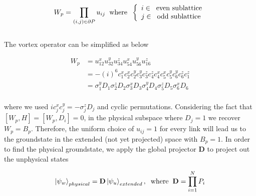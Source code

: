 \documentclass{article}
\begin{document}
\begin{equation}\label{eq:26}
	\begin{aligned}
		W_p = \prod_{(i,j)\in \partial P} u_{ij} \hspace{2mm}\text{where}\hspace{2mm}
		\left\{
		\begin{array}{l}
            i  \in \hspace{2mm} \text{even sublattice} \\
            j  \in \hspace{2mm} \text{odd sublattice}
        \end{array}
        \right.
	\end{aligned}
\end{equation}\\

The vortex operator can be simplified as below

\begin{equation}\label{eq:27}
	\begin{aligned}
		W_p &= u^x_{12}u^y_{32}u^z_{34}u^x_{54}u^y_{56}u^z_{16} \\
		&= -(i)^6 c^x_1 c^x_2 c^y_2 c^y_3 c^z_3 c^z_4 c^x_4 c^x_5 c^y_5 c^y_6 c^z_6 c^z_1 \\
		&= \sigma^y_1 D_1 \sigma^z_2 D_2 \sigma^x_3 D_3 \sigma^y_4 D_4 \sigma^z_5 D_5 \sigma^x_6 D_6 
	\end{aligned}
\end{equation}\\

where we used $i c^x_j c^y_j = -\sigma^z_j D_j$ and cyclic permutations. Considering the fact that $[W_p, H] = [W_p, D_i] = 0$, in the physical subspace where $D_j = 1$ we recover $W_p = B_p$. Therefore, the uniform choice of $u_{ij}=1$ for every link will lead us to the groundstate in the extended (not yet projected) space with $B_p = 1$. In order to find the physical groundstate, we apply the global projector $\mathbf{D}$ to project out the unphysical states

\begin{equation}\label{eq:28}
	\begin{aligned}
		\ket{\psi_w}_{physical} = \mathbf{D} \ket{\psi_u}_{extended},  \hspace{2mm}\text{where}\hspace{2mm} \mathbf{D} = \prod^N_{i=1} P_i
		\end{aligned}
\end{equation}\\
\end{document}
